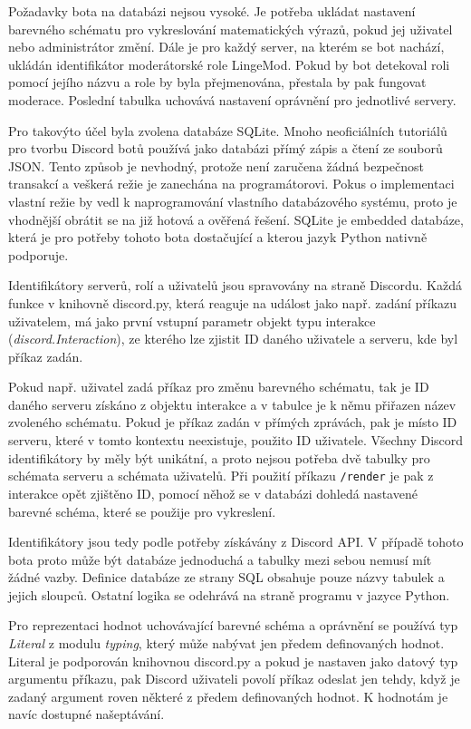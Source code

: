 \documentclass[FM]{tulthesis}
\begin{document}
	Požadavky bota na databázi nejsou vysoké. Je potřeba ukládat nastavení barevného schématu pro vykreslování matematických výrazů, pokud jej uživatel nebo administrátor změní. Dále je pro každý server, na kterém se bot nachází, ukládán identifikátor moderátorské role LingeMod. Pokud by bot detekoval roli pomocí jejího názvu a role by byla přejmenována, přestala by pak fungovat moderace. Poslední tabulka uchovává nastavení oprávnění pro jednotlivé servery.
	
	Pro takovýto účel byla zvolena databáze SQLite. Mnoho neoficiálních tutoriálů pro tvorbu Discord botů používá jako databázi přímý zápis a čtení ze souborů JSON. Tento způsob je nevhodný, protože není zaručena žádná bezpečnost transakcí a veškerá režie je zanechána na programátorovi. Pokus o implementaci vlastní režie by vedl k naprogramování vlastního databázového systému, proto je vhodnější obrátit se na již hotová a ověřená řešení. SQLite je embedded databáze, která je pro potřeby tohoto bota dostačující a kterou jazyk Python nativně podporuje.
	
	Identifikátory serverů, rolí a uživatelů jsou spravovány na straně Discordu. Každá funkce v knihovně discord.py, která reaguje na událost jako např. zadání příkazu uživatelem, má jako první vstupní parametr objekt typu interakce (\textit{discord.Interaction}), ze kterého lze zjistit ID daného uživatele a serveru, kde byl příkaz zadán. 
	
	Pokud např. uživatel zadá příkaz pro změnu barevného schématu, tak je ID daného serveru získáno z objektu interakce a v tabulce je k němu přiřazen název zvoleného schématu. Pokud je příkaz zadán v přímých zprávách, pak je místo ID serveru, které v tomto kontextu neexistuje, použito ID uživatele. Všechny Discord identifikátory by měly být unikátní, a proto nejsou potřeba dvě tabulky pro schémata serveru a schémata uživatelů. Při použití příkazu \verb|/render| je pak z interakce opět zjištěno ID, pomocí něhož se v databázi dohledá nastavené barevné schéma, které se použije pro vykreslení.
	
	Identifikátory jsou tedy podle potřeby získávány z Discord API. V případě tohoto bota proto může být databáze jednoduchá a tabulky mezi sebou nemusí mít žádné vazby. Definice databáze ze strany SQL obsahuje pouze názvy tabulek a jejich sloupců. Ostatní logika se odehrává na straně programu v jazyce Python.
	
	Pro reprezentaci hodnot uchovávající barevné schéma a oprávnění se používá typ \textit{Literal} z modulu \textit{typing}, který může nabývat jen předem definovaných hodnot. Literal je podporován knihovnou discord.py a pokud je nastaven jako datový typ argumentu příkazu, pak Discord uživateli povolí příkaz odeslat jen tehdy, když je zadaný argument roven některé z předem definovaných hodnot. K hodnotám je navíc dostupné našeptávání.
	
\end{document}
